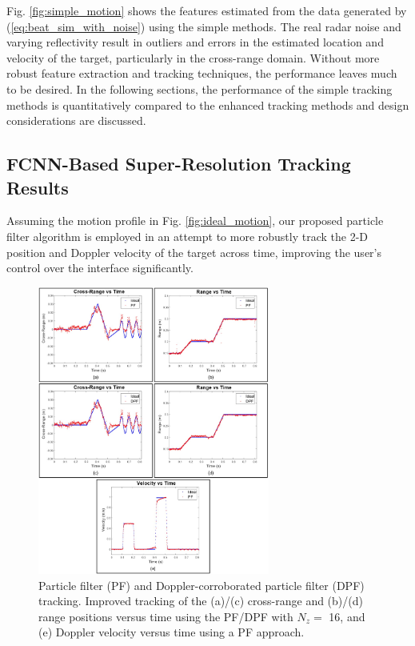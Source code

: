 \documentclass[10pt,journal,final]{IEEEtran}
\begin{document}
Fig. \ref{fig:simple_motion} shows the features estimated from the data generated by (\ref{eq:beat_sim_with_noise}) using the simple methods. 
The real radar noise and varying reflectivity result in outliers and errors in the estimated location and velocity of the target, particularly in the cross-range domain.
Without more robust feature extraction and tracking techniques, the performance leaves much to be desired.
In the following sections, the performance of the simple tracking methods is quantitatively compared to the enhanced tracking methods and design considerations are discussed.

\subsection{FCNN-Based Super-Resolution Tracking Results}
\label{subsec:enhanced_gesture_tracking_results}
Assuming the motion profile in Fig. \ref{fig:ideal_motion}, our proposed particle filter algorithm is employed in an attempt to more robustly track the 2-D position and Doppler velocity of the target across time, improving the user's control over the interface significantly.

\begin{figure}[h]
	\centering
	\includegraphics[width=3in]{smith10.jpg}
	\caption{Particle filter (PF) and Doppler-corroborated particle filter (DPF) tracking. Improved tracking of the (a)/(c) cross-range and (b)/(d) range positions versus time using the PF/DPF with $N_z =$ 16, and (e) Doppler velocity versus time using a PF approach.}
	\label{fig:pf_motion}
\end{figure}
\end{document}
